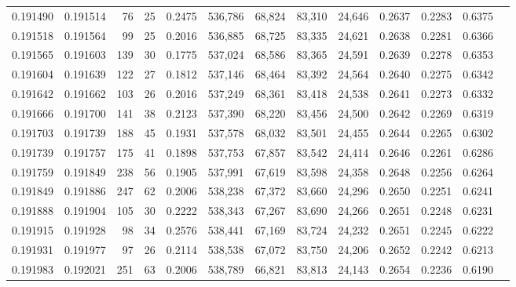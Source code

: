 \begin{tabular}{rrrrrrrrrrrrr}
0.191490 & 0.191514 &    76 &  25 &                                     0.2475 & 536,786 &  68,824 &  83,310 &  24,646 & 0.2637 & 0.2283 & 0.6375 \\
0.191518 & 0.191564 &    99 &  25 &                                     0.2016 & 536,885 &  68,725 &  83,335 &  24,621 & 0.2638 & 0.2281 & 0.6366 \\
0.191565 & 0.191603 &   139 &  30 &                                     0.1775 & 537,024 &  68,586 &  83,365 &  24,591 & 0.2639 & 0.2278 & 0.6353 \\
0.191604 & 0.191639 &   122 &  27 &                                     0.1812 & 537,146 &  68,464 &  83,392 &  24,564 & 0.2640 & 0.2275 & 0.6342 \\
0.191642 & 0.191662 &   103 &  26 &                                     0.2016 & 537,249 &  68,361 &  83,418 &  24,538 & 0.2641 & 0.2273 & 0.6332 \\
0.191666 & 0.191700 &   141 &  38 &                                     0.2123 & 537,390 &  68,220 &  83,456 &  24,500 & 0.2642 & 0.2269 & 0.6319 \\
0.191703 & 0.191739 &   188 &  45 &                                     0.1931 & 537,578 &  68,032 &  83,501 &  24,455 & 0.2644 & 0.2265 & 0.6302 \\
0.191739 & 0.191757 &   175 &  41 &                                     0.1898 & 537,753 &  67,857 &  83,542 &  24,414 & 0.2646 & 0.2261 & 0.6286 \\
0.191759 & 0.191849 &   238 &  56 &                                     0.1905 & 537,991 &  67,619 &  83,598 &  24,358 & 0.2648 & 0.2256 & 0.6264 \\
0.191849 & 0.191886 &   247 &  62 &                                     0.2006 & 538,238 &  67,372 &  83,660 &  24,296 & 0.2650 & 0.2251 & 0.6241 \\
0.191888 & 0.191904 &   105 &  30 &                                     0.2222 & 538,343 &  67,267 &  83,690 &  24,266 & 0.2651 & 0.2248 & 0.6231 \\
0.191915 & 0.191928 &    98 &  34 &                                     0.2576 & 538,441 &  67,169 &  83,724 &  24,232 & 0.2651 & 0.2245 & 0.6222 \\
0.191931 & 0.191977 &    97 &  26 &                                     0.2114 & 538,538 &  67,072 &  83,750 &  24,206 & 0.2652 & 0.2242 & 0.6213 \\
0.191983 & 0.192021 &   251 &  63 &                                     0.2006 & 538,789 &  66,821 &  83,813 &  24,143 & 0.2654 & 0.2236 & 0.6190 \\

\end{tabular}
